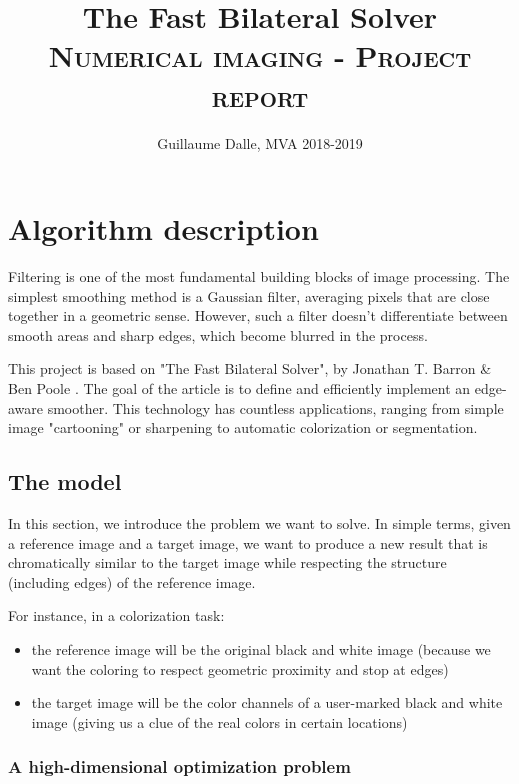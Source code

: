 \documentclass{article}
\title{\textbf{The Fast Bilateral Solver}
\\
\textsc{Numerical imaging - Project report}}
\author{Guillaume Dalle, MVA 2018-2019}
\date{}
\begin{document}
\maketitle

\tableofcontents

\newpage

\section{Algorithm description}

Filtering is one of the most fundamental building blocks of image processing. The simplest smoothing method is a Gaussian filter, averaging pixels that are close together in a geometric sense. However, such a filter doesn't differentiate between smooth areas and sharp edges, which become blurred in the process.

\medskip

This project is based on "The Fast Bilateral Solver", by Jonathan T. Barron \& Ben Poole \cite{barron_fast_2016}.
The goal of the article is to define and efficiently implement an edge-aware smoother. This technology has countless applications, ranging from simple image "cartooning" or sharpening to automatic colorization or segmentation.

\subsection{The model}

In this section, we introduce the problem we want to solve. In simple terms, given a reference image and a target image, we want to produce a new result that is chromatically similar to the target image while respecting the structure (including edges) of the reference image.

For instance, in a colorization task:
\begin{itemize}
    \item the reference image will be the original black and white image (because we want the coloring to respect geometric proximity and stop at edges)
    \item the target image will be the color channels of a user-marked black and white image (giving us a clue of the real colors in certain locations)
\end{itemize}

\subsubsection{A high-dimensional optimization problem}
\end{document}
